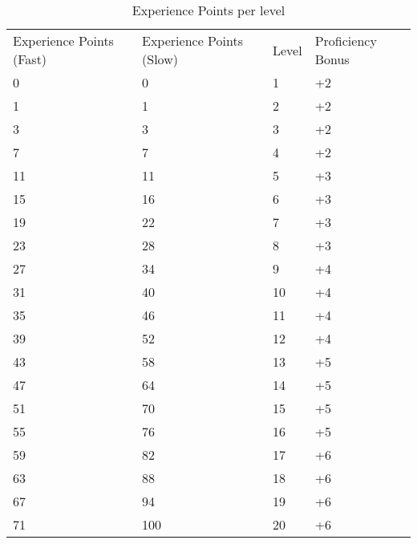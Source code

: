 \begin{table*}[ht]
    \centering
    \begin{tabularx}{\textwidth}{|X|X|X|X|}
        \hline
        Experience Points (Fast) & Experience Points (Slow) & Level & Proficiency Bonus \\
        0 & 0 & 1 & +2 \\
        1 & 1 & 2 & +2 \\
        3 & 3 & 3 & +2 \\
        7 & 7 & 4 & +2 \\
        11 & 11 & 5 & +3 \\
        15 & 16 & 6 & +3 \\
        19 & 22 & 7 & +3 \\
        23 & 28 & 8 & +3 \\
        27 & 34 & 9 & +4 \\
        31 & 40 & 10 & +4 \\
        35 & 46 & 11 & +4 \\
        39 & 52 & 12 & +4 \\
        43 & 58 & 13 & +5 \\
        47 & 64 & 14 & +5 \\
        51 & 70 & 15 & +5 \\
        55 & 76 & 16 & +5 \\
        59 & 82 & 17 & +6 \\
        63 & 88 & 18 & +6 \\
        67 & 94 & 19 & +6 \\
        71 & 100 & 20 & +6 \\
        \hline
    \end{tabularx}
    \caption[XP per level]{Experience Points per level}
    \label{tbl:xp-level}
\end{table*}